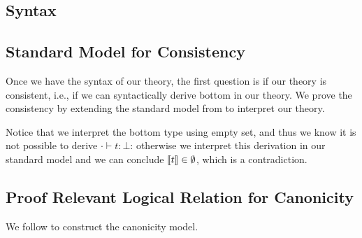 \subsection{Syntax}





\subsection{Standard Model for Consistency}
Once we have the syntax of our theory, the first question is if our theory is consistent, i.e., if we can syntactically derive bottom in our theory. We prove the consistency by extending the standard model from \citep{kaposi2017type} to interpret our theory. 


Notice that we interpret the bottom type using empty set, and thus we know it is not possible to derive $\cdot \vdash t : \bot$: otherwise we interpret this derivation in our standard model and we can conclude ${\llbracket {t} \rrbracket} \in \emptyset$, which is a contradiction.


\subsection{Proof Relevant Logical Relation for Canonicity}
We follow \citep{sterling2019algebraic,coquand2018canonicity} to construct the canonicity model. 
